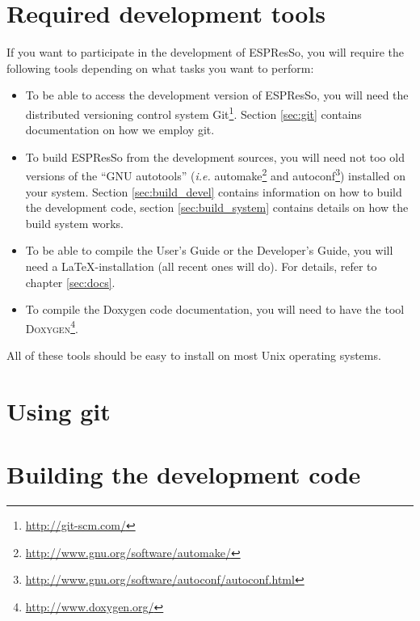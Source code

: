 \documentclass[
a4paper,                        %
11pt,                           %
twoside,                        %
footsepline,                    %
headsepline,                    %
headexclude,                    %
footexclude,                    %
pagesize,                       %
bibtotocnumbered,               %
idxtotoc                        %
]{scrartcl}
\newcommand{\es}{\mbox{\textsf{ESPResSo}}\xspace}
\newcommand{\ie}{\textit{i.e.}\xspace}
\begin{document}
\section{Required development tools}
\label{sec:requirements}

If you want to participate in the development of \es, you will require
the following tools depending on what tasks you want to perform:

\begin{itemize}
\item To be able to access the development version of \es, you will
  need the distributed versioning control system
  Git\footnote{\url{http://git-scm.com/}}.  Section \vref{sec:git}
  contains documentation on how we employ git.
\item To build \es from the development sources, you will need not too
  old versions of the ``GNU autotools'' (\ie
  automake\footnote{\url{http://www.gnu.org/software/automake/}} and
  autoconf\footnote{\url{http://www.gnu.org/software/autoconf/autoconf.html}})
  installed on your system. Section \vref{sec:build_devel} contains
  information on how to build the development code, section
  \vref{sec:build_system} contains details on how the build system
  works.
\item To be able to compile the User's Guide or the Developer's Guide,
  you will need a \LaTeX-installation (all recent ones will do). For
  details, refer to chapter \vref{sec:docs}.
\item To compile the Doxygen code documentation, you will need to have
  the tool \textsc{Doxygen}\footnote{\url{http://www.doxygen.org/}}.
\end{itemize}

All of these tools should be easy to install on most Unix operating
systems.

\section{Using git}
\label{sec:git}

\section{Building the development code}
\label{sec:build_devel}
\end{document}
